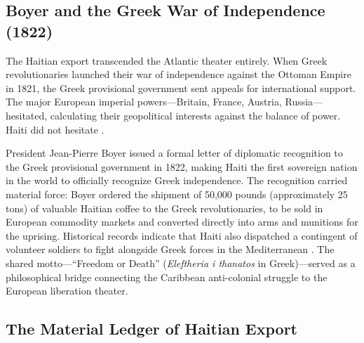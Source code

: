 \subsection{Boyer and the Greek War of Independence (1822)}

The Haitian export transcended the Atlantic theater entirely. When Greek revolutionaries launched their war of independence against the Ottoman Empire in 1821, the Greek provisional government sent appeals for international support. The major European imperial powers---Britain, France, Austria, Russia---hesitated, calculating their geopolitical interests against the balance of power. Haiti did not hesitate \cite{haiti_constitution_1805}.

President Jean-Pierre Boyer issued a formal letter of diplomatic recognition to the Greek provisional government in 1822, making Haiti the first sovereign nation in the world to officially recognize Greek independence. The recognition carried material force: Boyer ordered the shipment of 50,000 pounds (approximately 25 tons) of valuable Haitian coffee to the Greek revolutionaries, to be sold in European commodity markets and converted directly into arms and munitions for the uprising. Historical records indicate that Haiti also dispatched a contingent of volunteer soldiers to fight alongside Greek forces in the Mediterranean \cite{haiti_constitution_1805}. The shared motto---``Freedom or Death'' (\textit{Eleftheria i thanatos} in Greek)---served as a philosophical bridge connecting the Caribbean anti-colonial struggle to the European liberation theater.

\subsection{The Material Ledger of Haitian Export}

